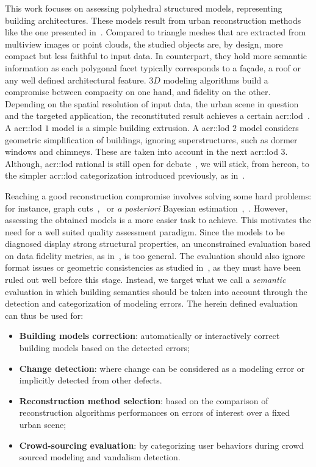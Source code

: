 \documentclass[runningheads]{llncs}
\begin{document}
    This work focuses on assessing polyhedral structured models, representing building architectures. These models result from urban reconstruction methods like the one presented in~\cite{dick2004modelling}. Compared to triangle meshes that are extracted from multiview images or point clouds, the studied objects are, by design, more compact but less faithful to input data. In counterpart, they hold more semantic information as each polygonal facet typically corresponds to a fa\c{c}ade, a roof or any well defined architectural feature. $3D$ modeling algorithms build a compromise between compacity on one hand, and fidelity on the other. Depending on the spatial resolution of input data, the urban scene in question and the targeted application, the reconstituted result achieves a certain \gls{acr::lod}~\cite{kolbe2005citygml}. A \acrshort{acr::lod} $1$ model is a simple building extrusion. A \acrshort{acr::lod} $2$ model considers geometric simplification of buildings, ignoring superstructures, such as dormer windows and chimneys. These are taken into account in the next \acrshort{acr::lod} $3$. Although, \acrshort{acr::lod} rational is still open for debate~\cite{2016_ceus_improved_lod}, we will stick, from hereon, to the simpler \acrshort{acr::lod} categorization introduced previously, as in~\cite{verdie2015lod}.

     Reaching a good reconstruction compromise involves solving some hard problems: for instance, graph cuts~\cite{verdie2015lod},~\cite{zebedin2008fusion} or \textit{a posteriori} Bayesian estimation~\cite{dick2004modelling},~\cite{Lafarge2010}. However, assessing the obtained models is a more easier task to achieve. This motivates the need for a well suited quality assessment paradigm. Since the models to be diagnosed display strong structural properties, an unconstrained evaluation based on data fidelity metrics, as in~\cite{berger2013benchmark}, is too general. The evaluation should also ignore format issues or geometric consistencies as studied in~\cite{ledoux2018val3dity}, as they must have been ruled out well before this stage. Instead, we target what we call a \textit{semantic} evaluation in which building semantics should be taken into account through the detection and categorization of modeling errors. The herein defined evaluation can thus be used for:
    \begin{itemize}
        \item \textbf{Building models correction}: automatically or interactively correct building models based on the detected errors;
        \item \textbf{Change detection}: where change can be considered as a modeling error or implicitly detected from other defects.
        \item \textbf{Reconstruction method selection}: based on the comparison of reconstruction algorithms performances on errors of interest over a fixed urban scene;
        \item \textbf{Crowd-sourcing evaluation}: by categorizing user behaviors during crowd sourced modeling and vandalism detection.
    \end{itemize}
\end{document}
